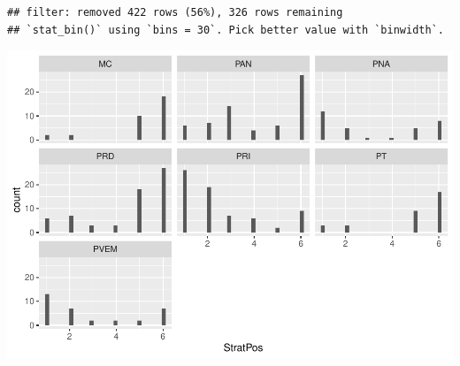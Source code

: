 \documentclass[
]{article}
\newenvironment{Shaded}{\begin{snugshade}}{\end{snugshade}}
\newcommand{\DecValTok}[1]{\textcolor[rgb]{0.00,0.00,0.81}{#1}}
\newcommand{\KeywordTok}[1]{\textcolor[rgb]{0.13,0.29,0.53}{\textbf{#1}}}
\newcommand{\NormalTok}[1]{#1}
\newcommand{\OperatorTok}[1]{\textcolor[rgb]{0.81,0.36,0.00}{\textbf{#1}}}
\newcommand{\StringTok}[1]{\textcolor[rgb]{0.31,0.60,0.02}{#1}}
\begin{document}
\begin{Shaded}
\end{Shaded}

\begin{verbatim}
## filter: removed 422 rows (56%), 326 rows remaining
## `stat_bin()` using `bins = 30`. Pick better value with `binwidth`.
\end{verbatim}

\includegraphics{ProposalAnalysis_files/figure-latex/unnamed-chunk-9-2.pdf}

\begin{Shaded}
\end{Shaded}
\end{document}

